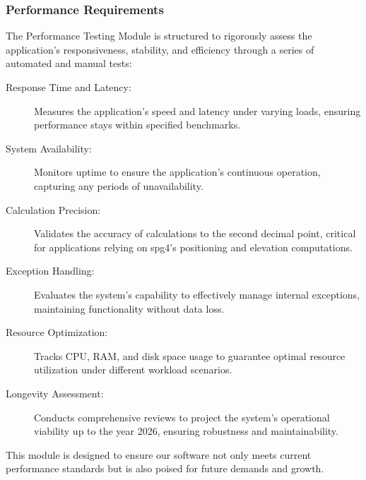 \documentclass[12pt, titlepage]{article}
\begin{document}
\subsubsection{Performance Requirements}

The Performance Testing Module is structured to rigorously assess the application's responsiveness, stability, and efficiency through a series of automated and manual tests:

\begin{description}
    \item[Response Time and Latency:] Measures the application's speed and latency under varying loads, ensuring performance stays within specified benchmarks.
    \item[System Availability:] Monitors uptime to ensure the application's continuous operation, capturing any periods of unavailability.
    \item[Calculation Precision:] Validates the accuracy of calculations to the second decimal point, critical for applications relying on spg4's positioning and elevation computations.
    \item[Exception Handling:] Evaluates the system's capability to effectively manage internal exceptions, maintaining functionality without data loss.
    \item[Resource Optimization:] Tracks CPU, RAM, and disk space usage to guarantee optimal resource utilization under different workload scenarios.
    \item[Longevity Assessment:] Conducts comprehensive reviews to project the system's operational viability up to the year 2026, ensuring robustness and maintainability.
\end{description}

This module is designed to ensure our software not only meets current performance standards but is also poised for future demands and growth.
\end{document}
